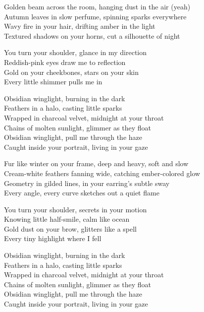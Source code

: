 \begin{lyrics}
Golden beam across the room, hanging dust in the air (yeah)\\
Autumn leaves in slow perfume, spinning sparks everywhere\\
Wavy fire in your hair, drifting amber in the light\\
Textured shadows on your horns, cut a silhouette of night

You turn your shoulder, glance in my direction\\
Reddish-pink eyes draw me to reflection\\
Gold on your cheekbones, stars on your skin\\
Every little shimmer pulls me in

Obsidian winglight, burning in the dark\\
Feathers in a halo, casting little sparks\\
Wrapped in charcoal velvet, midnight at your throat\\
Chains of molten sunlight, glimmer as they float\\
Obsidian winglight, pull me through the haze\\
Caught inside your portrait, living in your gaze

Fur like winter on your frame, deep and heavy, soft and slow\\
Cream-white feathers fanning wide, catching ember-colored glow\\
Geometry in gilded lines, in your earring’s subtle sway\\
Every angle, every curve sketches out a quiet flame

You turn your shoulder, secrets in your motion\\
Knowing little half-smile, calm like ocean\\
Gold dust on your brow, glitters like a spell\\
Every tiny highlight where I fell

Obsidian winglight, burning in the dark\\
Feathers in a halo, casting little sparks\\
Wrapped in charcoal velvet, midnight at your throat\\
Chains of molten sunlight, glimmer as they float\\
Obsidian winglight, pull me through the haze\\
Caught inside your portrait, living in your gaze


\end{lyrics}
